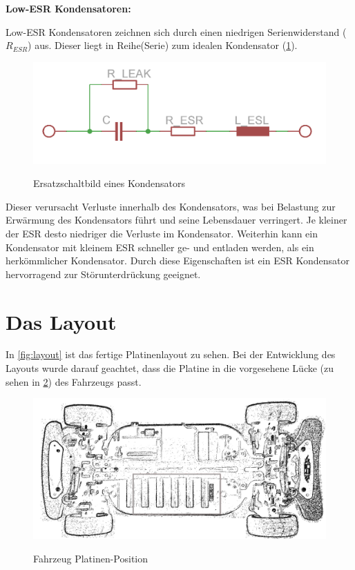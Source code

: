 \textbf{Low-ESR Kondensatoren:\\}

Low-ESR Kondensatoren zeichnen sich durch einen niedrigen Serienwiderstand ($R_{ESR}$) aus.
Dieser liegt in Reihe(Serie) zum idealen Kondensator (\cref{fig:esr}). 

\begin{figure}[H]
\centering
\includegraphics[width=.56\textwidth]{esr.png}\\
\caption{Ersatzschaltbild eines Kondensators}%
\label{fig:esr}
\end{figure}

Dieser verursacht Verluste innerhalb des Kondensators, was bei Belastung zur Erwärmung des Kondensators führt und
seine Lebensdauer verringert. Je kleiner der ESR desto niedriger die Verluste im Kondensator. Weiterhin
kann ein Kondensator mit kleinem ESR schneller ge- und entladen werden, als ein herkömmlicher Kondensator.
Durch diese Eigenschaften ist ein ESR Kondensator hervorragend zur Störunterdrückung geeignet.






\section{Das Layout}
In \cref{fig:layout} ist das fertige Platinenlayout zu sehen. Bei der Entwicklung des Layouts wurde darauf geachtet, dass die Platine in die vorgesehene Lücke (zu sehen in \cref{fig:car_struc}) des Fahrzeugs passt.

\begin{figure}[H]
\centering
\includegraphics[width=.8\textwidth]{auto_struck.png}\\
\caption{Fahrzeug Platinen-Position}%
\label{fig:car_struc}
\end{figure}

